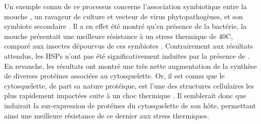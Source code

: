 

Un exemple connu de ce processus concerne l'association symbiotique entre la mouche , un ravageur de culture et vecteur de virus phytopathogènes, et son symbiote secondaire .
Il a en effet été montré qu'en présence de la bactérie, la mouche présentait une meilleure résistance à un stress thermique de 40\textdegree{}C, comparé aux insectes dépourvus de ces symbiotes \cite{brumin2011}.
Contrairement aux résultats attendus, les HSPs n'ont pas été significativement induites par la présence de .
En revanche, les résultats ont montré une très nette augmentation de la synthèse de diverses protéines associées au cytosquelette.
Or, il est connu que le cytosquelette, de part sa nature protéique, est l'une des structures cellulaires les plus rapidement impactées suite à un choc thermique \cite{brumin2011}.
Il semblerait donc que  induirait la sur-expression de protéines du cytosquelette de son hôte, permettant ainsi une meilleure résistance de ce dernier aux stress thermiques.

